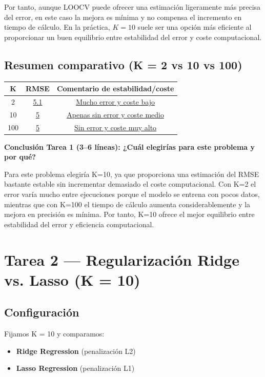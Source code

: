\documentclass[12pt,oneside]{book}
\begin{document}
Por tanto, aunque LOOCV puede ofrecer una estimación ligeramente más precisa del error, en este caso la mejora es mínima y no compensa el incremento en tiempo de cálculo. En la práctica, $K=10$ suele ser una opción más eficiente al proporcionar un buen equilibrio entre estabilidad del error y coste computacional.
\subsection{Resumen comparativo (K = 2 vs 10 vs 100)}

\begin{center}
\begin{tabular}{|c|c|c|}
\hline
K & RMSE & Comentario de estabilidad/coste \\
\hline
2 & \underline{5.1} & \underline{Mucho error y coste bajo} \\
10 & \underline{5} & \underline{Apenas sin error y coste medio} \\
100 & \underline{5} & \underline{Sin error y coste muy alto} \\
\hline
\end{tabular}
\end{center}

\vspace{0.3cm}
\noindent\textbf{Conclusión Tarea 1 (3--6 líneas):
¿Cuál elegirías para este problema y por qué?}

Para este problema elegiría K=10, ya que proporciona una estimación del RMSE bastante estable sin incrementar demasiado el coste computacional. Con K=2 el error varía mucho entre ejecuciones porque el modelo se entrena con pocos datos, mientras que con K=100 el tiempo de cálculo aumenta considerablemente y la mejora en precisión es mínima. Por tanto, K=10 ofrece el mejor equilibrio entre estabilidad del error y eficiencia computacional.

\newpage

\section{Tarea 2 — Regularización Ridge vs. Lasso (K = 10)}

\subsection*{Configuración}
Fijamos K = 10 y comparamos:
\begin{itemize}
    \item \textbf{Ridge Regression} (penalización L2)
    \item \textbf{Lasso Regression} (penalización L1)
\end{itemize}
\end{document}
